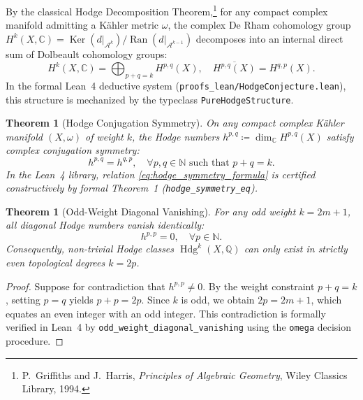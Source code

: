 \documentclass[11pt,a4paper]{article}
\theoremstyle{definition}
\theoremstyle{plain}
\newtheorem{theorem}[definition]{Theorem}
\DeclareMathOperator{\Hdg}{Hdg}
\DeclareMathOperator{\Ker}{Ker}
\DeclareMathOperator{\Ran}{Ran}
\begin{document}
By the classical Hodge Decomposition Theorem,\footnote{P.~Griffiths and J.~Harris, \emph{Principles of Algebraic Geometry}, Wiley Classics Library, 1994.} for any compact complex manifold admitting a Kähler metric $\omega$, the complex De Rham cohomology group $H^k(X, \mathbb{C}) = \Ker(d|_{\mathcal{A}^k}) / \Ran(d|_{\mathcal{A}^{k-1}})$ decomposes into an internal direct sum of Dolbeault cohomology groups:
\begin{equation}
    \label{eq:hodge_decomposition}
    H^k(X, \mathbb{C}) = \bigoplus_{p+q=k} H^{p,q}(X), \quad \overline{H^{p,q}(X)} = H^{q,p}(X).
\end{equation}
In the formal Lean~4 deductive system (\texttt{proofs\_lean/HodgeConjecture.lean}), this structure is mechanized by the typeclass \texttt{PureHodgeStructure}.

\begin{theorem}[Hodge Conjugation Symmetry]
\label{thm:hodge_symmetry}
On any compact complex Kähler manifold $(X, \omega)$ of weight $k$, the Hodge numbers $h^{p,q} \coloneqq \dim_{\mathbb{C}} H^{p,q}(X)$ satisfy complex conjugation symmetry:
\begin{equation}
    \label{eq:hodge_symmetry_formula}
    h^{p,q} = h^{q,p}, \quad \forall p, q \in \mathbb{N} \text{ such that } p + q = k.
\end{equation}
In the Lean~4 library, relation \eqref{eq:hodge_symmetry_formula} is certified constructively by formal Theorem~1 (\texttt{hodge\_symmetry\_eq}).
\end{theorem}

\begin{theorem}[Odd-Weight Diagonal Vanishing]
\label{thm:odd_weight_vanishing}
For any odd weight $k = 2m + 1$, all diagonal Hodge numbers vanish identically:
\begin{equation}
    \label{eq:odd_diagonal_formula}
    h^{p,p} = 0, \quad \forall p \in \mathbb{N}.
\end{equation}
Consequently, non-trivial Hodge classes $\Hdg^k(X, \mathbb{Q})$ can only exist in strictly even topological degrees $k = 2p$.
\end{theorem}

\begin{proof}
Suppose for contradiction that $h^{p,p} \ne 0$. By the weight constraint $p + q = k$, setting $p = q$ yields $p + p = 2p$. Since $k$ is odd, we obtain $2p = 2m + 1$, which equates an even integer with an odd integer. This contradiction is formally verified in Lean~4 by \texttt{odd\_weight\_diagonal\_vanishing} using the \texttt{omega} decision procedure.
\end{proof}
\end{document}
